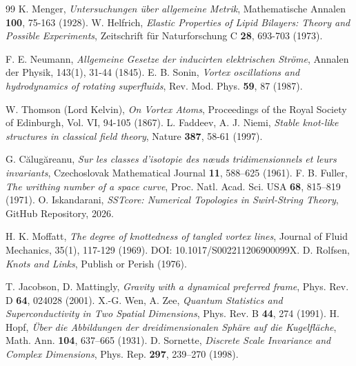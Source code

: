 \documentclass[12pt,a4paper]{article}
\begin{document}
\begin{thebibliography}{99}
K. Menger, \textit{Untersuchungen über allgemeine Metrik}, Mathematische Annalen \textbf{100}, 75-163 (1928).
W. Helfrich, \textit{Elastic Properties of Lipid Bilayers: Theory and Possible Experiments}, Zeitschrift für Naturforschung C \textbf{28}, 693-703 (1973).

F. E. Neumann, \textit{Allgemeine Gesetze der inducirten elektrischen Ströme}, Annalen der Physik, 143(1), 31-44 (1845).
E. B. Sonin, \textit{Vortex oscillations and hydrodynamics of rotating superfluids}, Rev. Mod. Phys. \textbf{59}, 87 (1987).

                        W. Thomson (Lord Kelvin), \textit{On Vortex Atoms}, Proceedings of the Royal Society of Edinburgh, Vol. VI, 94-105 (1867).
                        L. Faddeev, A. J. Niemi, \textit{Stable knot-like structures in classical field theory}, Nature \textbf{387}, 58-61 (1997).
  
                            G. C\u{a}lug\u{a}reanu, \textit{Sur les classes d'isotopie des n{\oe}uds tridimensionnels et leurs invariants}, Czechoslovak Mathematical Journal \textbf{11}, 588--625 (1961).
                            F. B. Fuller, \textit{The writhing number of a space curve}, Proc. Natl. Acad. Sci. USA \textbf{68}, 815--819 (1971).
                            O. Iskandarani, \textit{SSTcore: Numerical Topologies in Swirl-String Theory}, GitHub Repository, 2026.
                        
 
                        H. K. Moffatt, \textit{The degree of knottedness of tangled vortex lines}, Journal of Fluid Mechanics, 35(1), 117-129 (1969). DOI: 10.1017/S002211206900099X.
                        D. Rolfsen, \textit{Knots and Links}, Publish or Perish (1976).
   
                        

            T. Jacobson, D. Mattingly, \textit{Gravity with a dynamical preferred frame}, Phys. Rev. D \textbf{64}, 024028 (2001).
            X.-G. Wen, A. Zee, \textit{Quantum Statistics and Superconductivity in Two Spatial Dimensions}, Phys. Rev. B \textbf{44}, 274 (1991).
            H. Hopf, \textit{Über die Abbildungen der dreidimensionalen Sphäre auf die Kugelfläche}, Math. Ann. \textbf{104}, 637--665 (1931).
            D. Sornette, \textit{Discrete Scale Invariance and Complex Dimensions}, Phys. Rep. \textbf{297}, 239--270 (1998).
        \end{thebibliography}
\end{document}
